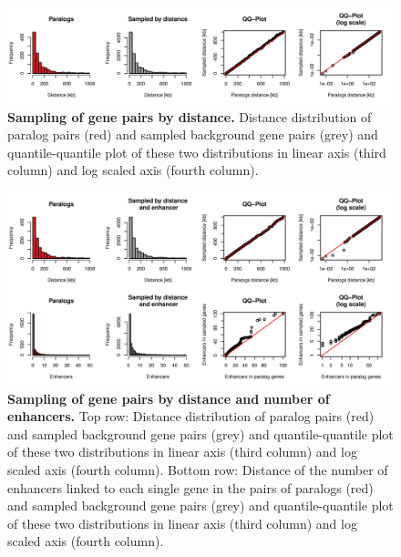 \documentclass[a4paper,twoside=true,openright,parskip=full,chapterprefix=true,11pt,headings=normal,bibliography=totoc,listof=totoc,titlepage=on,captions=tableabove,draft=false]{scrreprt}
\theoremstyle{definition}
\theoremstyle{definition}
\theoremstyle{definition}
\theoremstyle{remark}
\begin{document}
\begin{figure}

{\centering \includegraphics[width=0.8\linewidth]{figures/paralog/SI/figS3} 

}

\caption{\textbf{Sampling of gene pairs by distance.} Distance
distribution of paralog pairs (red) and sampled background gene pairs
(grey) and quantile-quantile plot of these two distributions in linear
axis (third column) and log scaled axis (fourth column).}\label{fig:samplingDist}
\end{figure}






\begin{figure}

{\centering \includegraphics[width=0.8\linewidth]{figures/paralog/SI/figS4} 

}

\caption{\textbf{Sampling of gene pairs by distance and
number of enhancers.} Top row: Distance distribution of paralog pairs
(red) and sampled background gene pairs (grey) and quantile-quantile
plot of these two distributions in linear axis (third column) and log
scaled axis (fourth column). Bottom row: Distance of the number of
enhancers linked to each single gene in the pairs of paralogs (red) and
sampled background gene pairs (grey) and quantile-quantile plot of these
two distributions in linear axis (third column) and log scaled axis
(fourth column).}\label{fig:samplingDistEh}
\end{figure}
\end{document}
